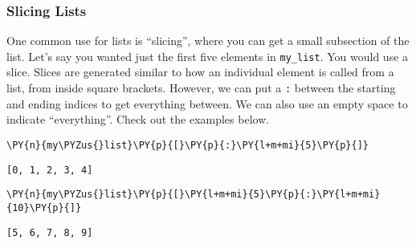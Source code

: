     \hypertarget{slicing-lists}{%
\subsubsection{Slicing Lists}\label{slicing-lists}}

One common use for lists is ``slicing'', where you can get a small
subsection of the list. Let's say you wanted just the first five
elements in \texttt{my\_list}. You would use a slice. Slices are
generated similar to how an individual element is called from a list,
from inside square brackets. However, we can put a \texttt{:} between
the starting and ending indices to get everything between. We can also
use an empty space to indicate ``everything''. Check out the examples
below.

    \begin{tcolorbox}[breakable, size=fbox, boxrule=1pt, pad at break*=1mm,colback=cellbackground, colframe=cellborder]
\begin{Verbatim}[commandchars=\\\{\}]
\PY{n}{my\PYZus{}list}\PY{p}{[}\PY{p}{:}\PY{l+m+mi}{5}\PY{p}{]}
\end{Verbatim}
\end{tcolorbox}

            \begin{tcolorbox}[breakable, size=fbox, boxrule=.5pt, pad at break*=1mm, opacityfill=0]
\begin{Verbatim}[commandchars=\\\{\}]
[0, 1, 2, 3, 4]
\end{Verbatim}
\end{tcolorbox}
        
    \begin{tcolorbox}[breakable, size=fbox, boxrule=1pt, pad at break*=1mm,colback=cellbackground, colframe=cellborder]
\begin{Verbatim}[commandchars=\\\{\}]
\PY{n}{my\PYZus{}list}\PY{p}{[}\PY{l+m+mi}{5}\PY{p}{:}\PY{l+m+mi}{10}\PY{p}{]}
\end{Verbatim}
\end{tcolorbox}

            \begin{tcolorbox}[breakable, size=fbox, boxrule=.5pt, pad at break*=1mm, opacityfill=0]
\begin{Verbatim}[commandchars=\\\{\}]
[5, 6, 7, 8, 9]
\end{Verbatim}
\end{tcolorbox}
        
